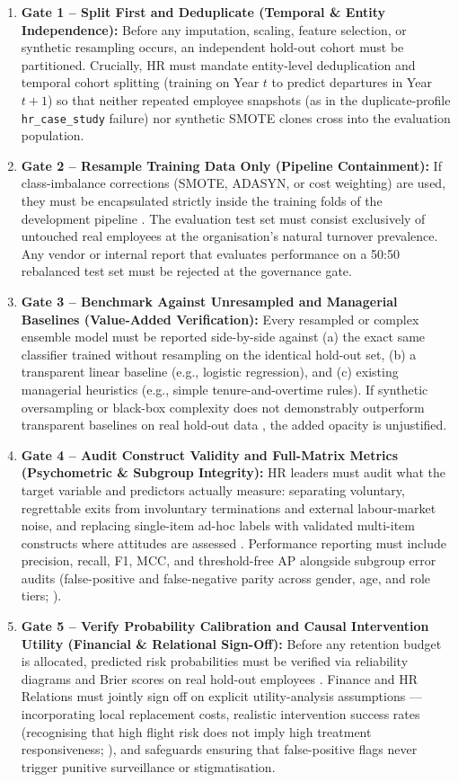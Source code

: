 \documentclass[12pt,a4paper]{article}
\begin{document}
\begin{enumerate}
\item \textbf{Gate 1 -- Split First and Deduplicate (Temporal \& Entity Independence):} Before any imputation, scaling, feature selection, or synthetic resampling occurs, an independent hold-out cohort must be partitioned. Crucially, HR must mandate entity-level deduplication and temporal cohort splitting (training on Year $t$ to predict departures in Year $t+1$) so that neither repeated employee snapshots (as in the duplicate-profile \texttt{hr\_case\_study} failure) nor synthetic SMOTE clones cross into the evaluation population.
\item \textbf{Gate 2 -- Resample Training Data Only (Pipeline Containment):} If class-imbalance corrections (SMOTE, ADASYN, or cost weighting) are used, they must be encapsulated strictly inside the training folds of the development pipeline \parencite{ref22}. The evaluation test set must consist exclusively of untouched real employees at the organisation's natural turnover prevalence. Any vendor or internal report that evaluates performance on a 50:50 rebalanced test set must be rejected at the governance gate.
\item \textbf{Gate 3 -- Benchmark Against Unresampled and Managerial Baselines (Value-Added Verification):} Every resampled or complex ensemble model must be reported side-by-side against (a) the exact same classifier trained without resampling on the identical hold-out set, (b) a transparent linear baseline (e.g., logistic regression), and (c) existing managerial heuristics (e.g., simple tenure-and-overtime rules). If synthetic oversampling or black-box complexity does not demonstrably outperform transparent baselines on real hold-out data \parencite{ref64}, the added opacity is unjustified.
\item \textbf{Gate 4 -- Audit Construct Validity and Full-Matrix Metrics (Psychometric \& Subgroup Integrity):} HR leaders must audit what the target variable and predictors actually measure: separating voluntary, regrettable exits from involuntary terminations and external labour-market noise, and replacing single-item ad-hoc labels with validated multi-item constructs where attitudes are assessed \parencite{ref36,ref62}. Performance reporting must include precision, recall, F1, MCC, and threshold-free AP alongside subgroup error audits (false-positive and false-negative parity across gender, age, and role tiers; \cite{ref49,ref53}).
\item \textbf{Gate 5 -- Verify Probability Calibration and Causal Intervention Utility (Financial \& Relational Sign-Off):} Before any retention budget is allocated, predicted risk probabilities must be verified via reliability diagrams and Brier scores on real hold-out employees \parencite{ref41,ref9}. Finance and HR Relations must jointly sign off on explicit utility-analysis assumptions \parencite{ref20}---incorporating local replacement costs, realistic intervention success rates (recognising that high flight risk does not imply high treatment responsiveness; \cite{ref45}), and safeguards ensuring that false-positive flags never trigger punitive surveillance or stigmatisation.
\end{enumerate}
\end{document}
